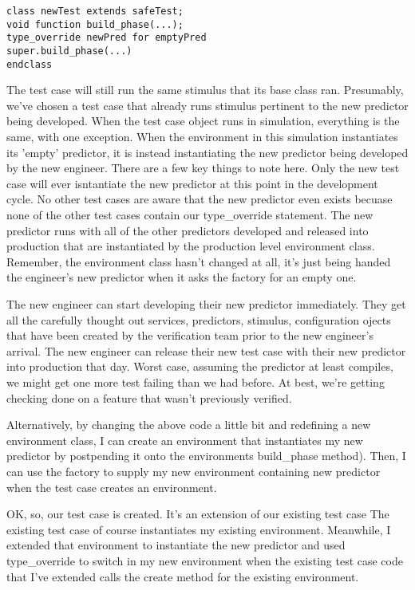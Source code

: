 \documentclass[twocolumn,letterpaper]{IEEEAerospaceCLS}  %
\begin{document}
\verb|class newTest extends safeTest;|
\\
\verb|void function build_phase(...);|
\\
\verb|type_override newPred for emptyPred|
\\
\verb|super.build_phase(...)|
\\
\verb|endclass|

The test case will still run the same stimulus that its base class ran. Presumably, we've chosen a test case that already runs stimulus pertinent to the new predictor being developed. When the test case object runs in simulation, everything is the same, with one exception. When the environment in this simulation instantiates its 'empty' predictor, it is instead instantiating the new predictor being developed by the new engineer. There are a few key things to note here. Only the new test case will ever isntantiate the new predictor at this point in the development cycle. No other test cases are aware that the new predictor even exists becuase none of the other test cases contain our type\_override statement. The new predictor runs with all  of the other predictors developed and released into production that are instantiated by the production level environment class. Remember, the environment class hasn't changed at all, it's just being handed the engineer's new predictor when it asks the factory for an empty one.

The new engineer can start developing their new predictor immediately. They get all the carefully thought out services, predictors, stimulus, configuration ojects that have been created by the verification team prior to the new engineer's arrival. The new engineer can release their new test case with their new predictor into production that day. Worst case, assuming the predictor at least compiles, we might get one more test failing than we had before. At best, we're getting checking done on a feature that wasn't previously verified.

Alternatively, by changing the above code a little bit and redefining a new environment class, I can create an environment that instantiates my new predictor by postpending it onto the environments build\_phase method). Then, I can use the factory to supply my new environment containing new predictor when the test case creates an environment.

OK, so, our test case is created. It's an extension of our existing test case The existing test case of course instantiates my existing environment. Meanwhile, I extended that environment to instantiate the new predictor and used type\_override to switch in my new environment when the existing test case code that I've extended calls the create method for the existing environment. 
\end{document}
